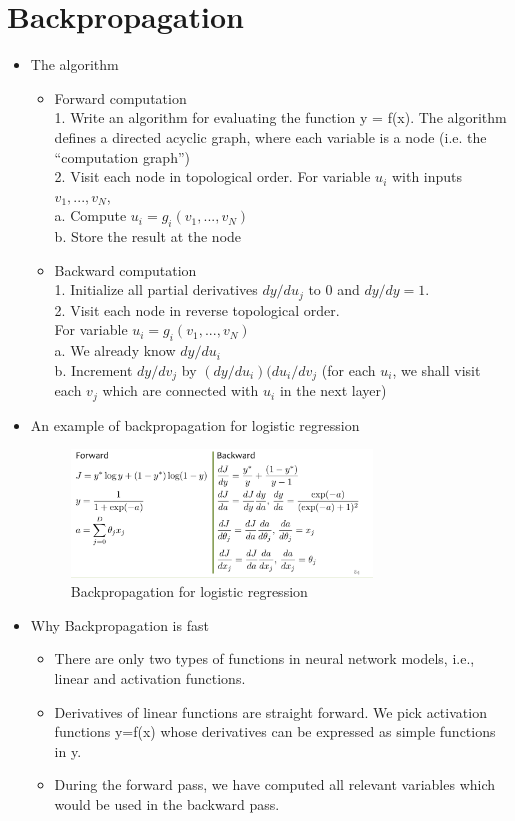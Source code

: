 \section{Backpropagation}
\begin{itemize}
    \item The algorithm
    \begin{itemize}
        \item Forward computation\\
1. Write an algorithm for evaluating the function y = f(x). The
algorithm defines a directed acyclic graph, where each variable is a
node (i.e. the “computation graph”)\\
2. Visit each node in topological order.
For variable $u_i$ with inputs $v_1,..., v_N$, \\
\tab a. Compute $u_i = g_i(v_1,..., v_N)$\\
\tab b. Store the result at the node
        \item Backward computation\\
1. Initialize all partial derivatives $dy/du_j$ to 0 and $dy/dy = 1$.\\
2. Visit each node in reverse topological order.\\
For variable $u_i = g_i(v_1,..., v_N)$\\
\tab a. We already know $dy/du_i$\\
\tab b. Increment $dy/dv_j$ by $(dy/du_i)(du_i/dv_j$ (for each $u_i$, we shall visit each $v_j$ which are connected with $u_i$ in the next layer)
    \end{itemize}
    \item An example of backpropagation for logistic regression
\begin{figure}[h]
    \centering
    \includegraphics[width=8cm]{figures/backprop.png}
    \caption{Backpropagation for logistic regression}
    \label{fig:backprop}
\end{figure}
    \item Why Backpropagation is fast
    \begin{itemize}
        \item There are only two types of functions in neural network models, i.e., linear and activation functions. 
        \item Derivatives of linear functions are straight forward. We pick activation functions y=f(x) whose derivatives can be expressed as simple functions in y.
        \item During the forward pass, we have computed all relevant variables which would be used in the backward pass.  
    \end{itemize}
\end{itemize}




